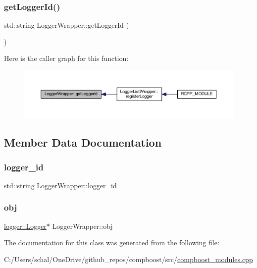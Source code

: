 \subsubsection{\texorpdfstring{get\+Logger\+Id()}{getLoggerId()}}
{\footnotesize\ttfamily std\+::string Logger\+Wrapper\+::get\+Logger\+Id (\begin{DoxyParamCaption}{ }\end{DoxyParamCaption})\hspace{0.3cm}{\ttfamily [inline]}}

Here is the caller graph for this function\+:\nopagebreak
\begin{figure}[H]
\begin{center}
\leavevmode
\includegraphics[width=350pt]{class_logger_wrapper_ad42b6f63cb509a7fa0d7e3aa82a95cb8_icgraph}
\end{center}
\end{figure}


\subsection{Member Data Documentation}
\mbox{\label{class_logger_wrapper_a8fd7e405de19e62a4627999e7b41ab07}} 
\subsubsection{\texorpdfstring{logger\+\_\+id}{logger\_id}}
{\footnotesize\ttfamily std\+::string Logger\+Wrapper\+::logger\+\_\+id\hspace{0.3cm}{\ttfamily [protected]}}

\mbox{\label{class_logger_wrapper_ad6ba450561dc58a6b83fb89c1a7efe97}} 
\subsubsection{\texorpdfstring{obj}{obj}}
{\footnotesize\ttfamily \mbox{\hyperlink{classlogger_1_1_logger}{logger\+::\+Logger}}$\ast$ Logger\+Wrapper\+::obj\hspace{0.3cm}{\ttfamily [protected]}}



The documentation for this class was generated from the following file\+:\begin{DoxyCompactItemize}
\item 
C\+:/\+Users/schal/\+One\+Drive/github\+\_\+repos/compboost/src/\mbox{\hyperlink{compboost__modules_8cpp}{compboost\+\_\+modules.\+cpp}}\end{DoxyCompactItemize}
